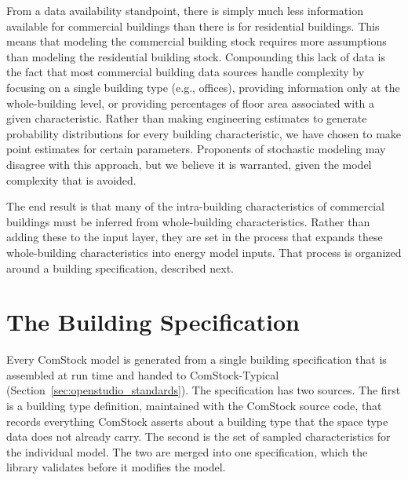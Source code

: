 From a data availability standpoint, there is simply much less information available for commercial buildings than there is for residential buildings. This means that modeling the commercial building stock requires more assumptions than modeling the residential building stock. Compounding this lack of data is the fact that most commercial building data sources handle complexity by focusing on a single building type (e.g., offices), providing information only at the whole-building level, or providing percentages of floor area associated with a given characteristic. Rather than making engineering estimates to generate probability distributions for every building characteristic, we have chosen to make point estimates for certain parameters. Proponents of stochastic modeling may disagree with this approach, but we believe it is warranted, given the model complexity that is avoided.

The end result is that many of the intra-building characteristics of commercial buildings must be inferred from whole-building characteristics. Rather than adding these to the input layer, they are set in the process that expands these whole-building characteristics into energy model inputs. That process is organized around a building specification, described next.

\section{The Building Specification}
\label{sec:building_spec}

Every ComStock model is generated from a single building specification that is assembled at run time and handed to ComStock-Typical (Section~\ref{sec:openstudio_standards}). The specification has two sources. The first is a building type definition, maintained with the ComStock source code, that records everything ComStock asserts about a building type that the space type data does not already carry. The second is the set of sampled characteristics for the individual model. The two are merged into one specification, which the library validates before it modifies the model.

